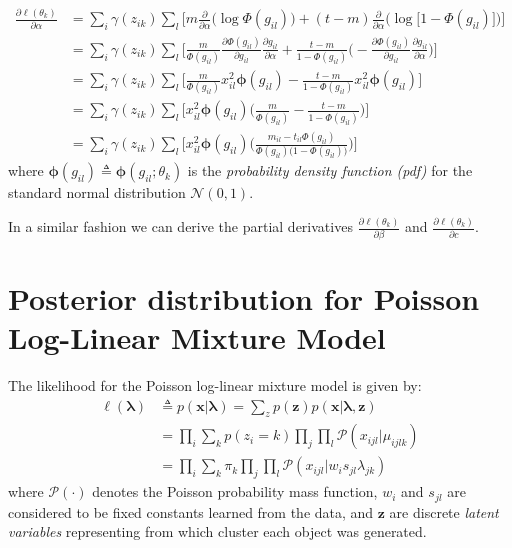 \begin{equation} \label{derivative-a-f-app}
  \begin{split}
	\frac{\partial \ell(\theta_{k})}{\partial \alpha} & = \sum_{i} \gamma(z_{ik}) \sum_{l} \bigg[ m \frac{\partial}{\partial \alpha}\big(\log \Phi(g_{il})\big) + (t-m) \frac{\partial}{\partial \alpha}\big(\log \big[1 - \Phi(g_{il})\big]\big)\bigg] \\
		& = \sum_{i} \gamma(z_{ik}) \sum_{l} \bigg[ \frac{m}{\Phi(g_{il})} \frac{\partial \Phi(g_{il})}{\partial g_{il}} \frac{\partial g_{il}}{\partial \alpha} + \frac{t - m}{1 - \Phi(g_{il})}\bigg( -\frac{\partial \Phi(g_{il})}{\partial g_{il}} \frac{\partial g_{il}}{\partial \alpha} \bigg) \bigg] \\
		& = \sum_{i} \gamma(z_{ik}) \sum_{l} \bigg[ \frac{m}{\Phi(g_{il})} x_{il}^{2} \mathbf{\phi}(g_{il}) - \frac{t - m}{1 - \Phi(g_{il})} x_{il}^{2} \mathbf{\phi}(g_{il}) \bigg]\\
		& = \sum_{i}  \gamma(z_{ik}) \sum_{l} \bigg[ x_{il}^{2} \mathbf{\phi}(g_{il})\bigg(\frac{m}{\Phi(g_{il})} - \frac{t - m}{1 - \Phi(g_{il})}\bigg) \bigg] \\
		& = \sum_{i}  \gamma(z_{ik}) \sum_{l} \bigg[ x_{il}^{2} \mathbf{\phi}(g_{il})\bigg(\frac{m_{il} - t_{il}\Phi(g_{il})}{\Phi(g_{il})\big(1-\Phi(g_{il})\big)} \bigg) \bigg]
	\end{split}
\end{equation}
where $\mathbf{\phi}(g_{il}) \triangleq \mathbf{\phi}(g_{il};\theta_{k})$ is the \emph{probability density function (pdf)} for the standard normal distribution $\mathcal{N}(0,1)$.

In a similar fashion we can derive the partial derivatives $\frac{\partial \ell(\theta_{k})}{\partial \beta}$ and $\frac{\partial \ell(\theta_{k})}{\partial c}$.




\section{Posterior distribution for Poisson Log-Linear Mixture Model}

The likelihood for the Poisson log-linear mixture model is given by:
\begin{equation} \label{poisson-log-lin-mm-app}
  \begin{split}
	\ell(\mathbf{\lambda}) & \triangleq p(\mathbf{x} | \mathbf{\lambda}) = \sum\limits_{z} p(\mathbf{z}) p(\mathbf{x} | \mathbf{\lambda}, \mathbf{z})\\
		& = \prod_{i} \sum_{k} p(z_{i} = k) \prod_{j} \prod_{l} \mathcal{P}(x_{ijl} | \mu_{ijlk}) \\
		& = \prod_{i} \sum_{k} \pi_{k} \prod_{j} \prod_{l} \mathcal{P}(x_{ijl} | w_{i}s_{jl} \lambda_{jk})
  \end{split}
\end{equation}
where $\mathcal{P}(\cdot)$ denotes the Poisson probability mass function, $w_{i}$ and $s_{jl}$ are considered to be fixed constants learned from the data, and $\mathbf{z}$ are discrete \emph{latent variables} representing from which cluster each object was generated. 

